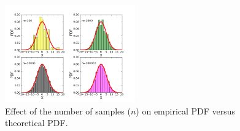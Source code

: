 \documentclass[10pt]{book}
\begin{document}
{\beforefig
\begin{figure}[h!]
  \centering
    \includegraphics[width=0.5\textwidth]{images/rand_theo.png}
  \caption{Effect of the number of samples ($n$) on empirical PDF versus theoretical PDF.}
   \label{fig:pdf_norm_n}
\end{figure}
\afterfig

}
\end{document}
